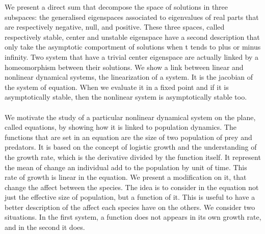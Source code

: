 We present a direct sum that decompose the space of solutions in three subspaces: the generalised eigenspaces associated to eigenvalues of real parts that are respectively negative, null, and positive. These three spaces, called respectively stable, center and unstable eigenspace have a second description that only take the asymptotic comportment of solutions when t tends to plus or minus infinity. Two system that have a trivial center eigenspace are actually linked by a homeomorphism between their solutions. We show a link between linear and nonlinear dynamical systems, the linearization of a system. It is the jacobian of the system of equation. When we evaluate it in a fixed point and if it is asymptotically stable, then the nonlinear system is asymptotically stable too. 
\\ \\
We motivate the study of a particular nonlinear dynamical system on the plane, called \LV equations, by showing how it is linked to population dynamics. The functions that are set in an equation are the size of two population of prey and predators. It is based on the concept of logistic growth and the understanding of the growth rate, which is the derivative divided by the function itself. It represent the mean of change an individual add to the population by unit of time. This rate of growth is linear in the \LV equation. We present a modification on it, that change the affect between the species. The idea is to consider in the equation not just the effective size of population, but a function of it. This is useful to have a better description of the affect each species have on the others. We consider two situations. In the first system, a function does not appears in its own growth rate, and in the second it does. 

